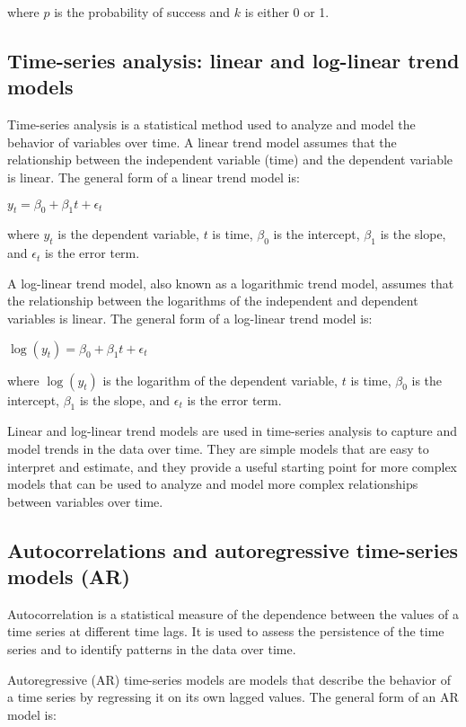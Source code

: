 \documentclass[12pt, a4paper, oneside]{article}
\begin{document}
where $p$ is the probability of success and $k$ is either 0 or 1.









\subsection{ Time-series analysis: linear and log-linear trend models }
Time-series analysis is a statistical method used to analyze and model the behavior of variables over time. A linear trend model assumes that the relationship between the independent variable (time) and the dependent variable is linear. The general form of a linear trend model is:

$y_t = \beta_0 + \beta_1 t + \epsilon_t$

where $y_t$ is the dependent variable, $t$ is time, $\beta_0$ is the intercept, $\beta_1$ is the slope, and $\epsilon_t$ is the error term.

A log-linear trend model, also known as a logarithmic trend model, assumes that the relationship between the logarithms of the independent and dependent variables is linear. The general form of a log-linear trend model is:

$\log(y_t) = \beta_0 + \beta_1 t + \epsilon_t$

where $\log(y_t)$ is the logarithm of the dependent variable, $t$ is time, $\beta_0$ is the intercept, $\beta_1$ is the slope, and $\epsilon_t$ is the error term.

Linear and log-linear trend models are used in time-series analysis to capture and model trends in the data over time. They are simple models that are easy to interpret and estimate, and they provide a useful starting point for more complex models that can be used to analyze and model more complex relationships between variables over time.

\subsection{ Autocorrelations and autoregressive time-series models (AR) }
Autocorrelation is a statistical measure of the dependence between the values of a time series at different time lags. It is used to assess the persistence of the time series and to identify patterns in the data over time.

Autoregressive (AR) time-series models are models that describe the behavior of a time series by regressing it on its own lagged values. The general form of an AR model is:
\end{document}
